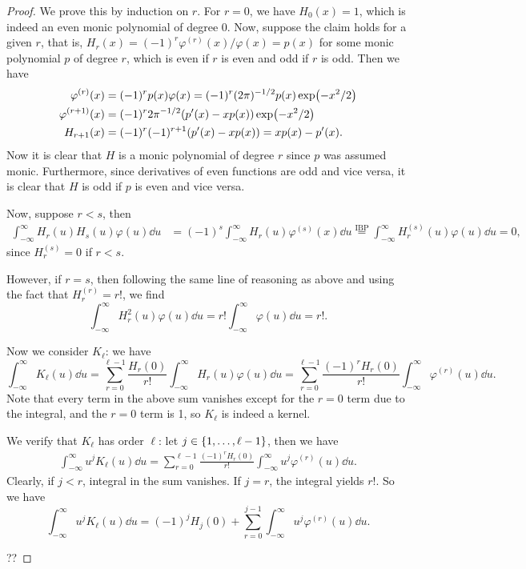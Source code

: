 \documentclass{article}
\theoremstyle{plain}
\theoremstyle{remark}
\renewcommand{\phi}{\varphi}
\begin{document}
\begin{proof}
 	We prove this by induction on $r$. For $r = 0$, we have $H_0(x) = 1$, which is indeed an even monic polynomial of degree 0. 
 	Now, suppose the claim holds for a given $r$, that is, $H_r(x) = (-1)^r \phi^{(r)}(x)/\phi(x) = p(x)$ for some monic polynomial $p$ of degree $r$, which is even if $r$ is even and odd if $r$ is odd. Then we have
 	\begin{align*}
 	\phi^{(r)}(x) &= (-1)^r p(x) \phi(x) = (-1)^r (2\pi)^{-1/2} p(x) \exp(-x^2/2) \\
 	\phi^{(r+1)}(x) &= (-1)^r 2\pi^{-1/2} \qty(p'(x) - x p(x)) \exp(-x^2/2) \\
 	H_{r+1 }(x) &= (-1)^r (-1)^{r+1} \qty(p'(x) - x p(x)) = xp(x) - p'(x). 
 	\end{align*}
 	Now it is clear that $H$ is a monic polynomial of degree $r$ since $p$ was assumed monic. Furthermore, since derivatives of even functions are odd and vice versa, it is clear that $H$ is odd if $p$ is even and vice versa. 

	Now, suppose $r < s$, then 
	\begin{align*}
		\int_{-\infty}^\infty H_r(u) H_s(u) \phi(u) \dd{u} &= (-1)^s \int_{-\infty}^\infty H_r(u) \phi^{(s)}(x) \dd{u} \overset{\text{IBP}}= \int_{-\infty}^\infty H_r^{(s)}(u) \phi(u) \dd{u} = 0,
	\end{align*}
since $H_r^{(s)} = 0$ if $r < s$. 

However, if $r = s$, then following the same line of reasoning as above and using the fact that $H_r^{(r)} = r!$, we find
\[
\int_{-\infty}^\infty H_r^2(u) \phi(u) \dd{u} = r! \int_{-\infty}^\infty \phi(u) \dd{u} = r!. 
\]

Now we consider $K_\ell$: we have
\[
\int_{-\infty}^\infty K_\ell(u) \dd{u} = \sum_{r=0}^{\ell - 1} \frac{H_r(0)}{r!} \int_{-\infty}^\infty H_r(u) \phi(u) \dd{u} =  \sum_{r=0}^{\ell - 1} \frac{(-1)^r H_r(0)}{r!} \int_{-\infty}^\infty \phi^{(r)}(u) \dd{u}.
\]
Note that every term in the above sum vanishes except for the $r = 0$ term due to the integral, and the $r = 0$ term is 1, so $K_\ell$ is indeed a kernel. 

We verify that $K_\ell$ has order $\ell$: let $j \in \qty{1, \dotsc, \ell - 1}$, then we have
\begin{align*}
	\int_{-\infty}^\infty u^j K_\ell(u) \dd{u} = \sum_{r=0}^{\ell - 1} \frac{(-1)^r H_r(0)}{r!} \int_{-\infty}^\infty u^j \phi^{(r)}(u) \dd{u}.
\end{align*}
Clearly, if $j < r$, integral in the sum vanishes. If $j = r$, the integral yields $r!$. So we have
\[
\int_{-\infty}^\infty u^j K_\ell(u) \dd{u} = (-1)^j H_j(0) + \sum_{r=0}^{j-1} \int_{-\infty}^\infty u^j \phi^{(r)}(u) \dd{u}. 
\]

??
\end{proof}
\end{document}
